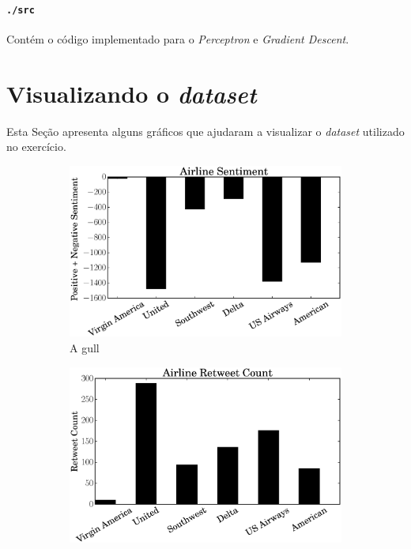 \documentclass[a4paper, 12pt]{article}
\begin{document}
\paragraph{\texttt{./src}} Contém o código implementado
para o \textit{Perceptron} e \textit{Gradient Descent}.

\section{Visualizando o \textit{dataset}} \label{sec:viz}

Esta Seção apresenta alguns gráficos que ajudaram a visualizar
o \textit{dataset} utilizado no exercício.

\begin{figure}
    \centering
    \begin{subfigure}[b]{0.45\textwidth}
        \includegraphics[width=\textwidth]{airline_sentiment}
        \caption{A gull}
        \label{fig:gull}
    \end{subfigure}
    \begin{subfigure}[b]{0.45\textwidth}
        \includegraphics[width=\textwidth]{airline_retweet}

\end{subfigure}
\end{figure}
\end{document}
